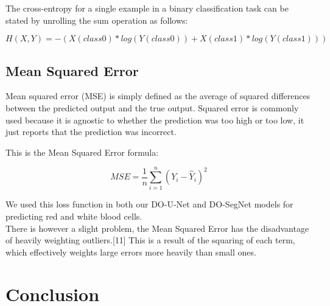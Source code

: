 The cross-entropy for a single example in a binary classification task can be stated by unrolling the sum operation as follows:

\begin{equation}
    H(X, Y) = - (X(class0) * log(Y(class0)) + X(class1) * log(Y(class1)))
\end{equation}

\subsection{Mean Squared Error}
Mean squared error (MSE) is simply defined as the average of squared differences between the predicted output and the true output. Squared error is commonly used because it is agnostic to whether the prediction was too high or too low, it just reports that the prediction was incorrect.

This is the Mean Squared Error formula:

\begin{equation}
    MSE = \frac{1}{n} \sum_{i=1}^{n} (Y_{i} - \hat{Y}_{i})^{2}
\end{equation}

We used this loss function in both our DO-U-Net and DO-SegNet models for predicting red and white blood cells.\\

There is however a slight problem, the Mean Squared Error has the disadvantage of heavily weighting outliers.[11] This is a result of the squaring of each term, which effectively weights large errors more heavily than small ones.

\section{Conclusion}
\vspace{0.2in}
\hspace*{0.16in}

\newpage
